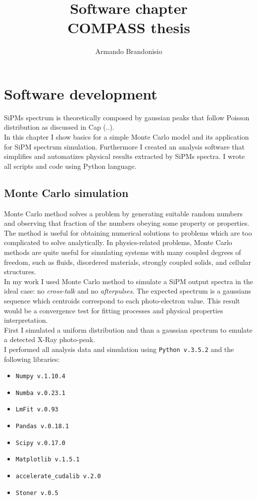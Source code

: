 \documentclass[10pt,a4paper, openany]{book}
\author{Armando Brandonisio}
\title{\textbf{Software chapter}\\COMPASS thesis}
\begin{document}
\maketitle
\tableofcontents \newpage

\chapter{Software development}
SiPMs spectrum is theoretically composed by gaussian peaks that follow Poisson distribution as discussed in Cap (..).\\
In this chapter I show basics for a simple Monte Carlo model and its application for SiPM spectrum simulation. Furthermore I created an analysis software that simplifies and automatizes physical results extracted by SiPMs spectra. I wrote all scripts and code using Python language. 

\section{Monte Carlo simulation}
Monte Carlo method solves a problem by generating suitable random numbers and observing that fraction of the numbers obeying some property or properties. The method is useful for obtaining numerical solutions to problems which are too complicated to solve analytically. In physics-related problems, Monte Carlo methods are quite useful for simulating systems with many coupled degrees of freedom, such as fluids, disordered materials, strongly coupled solids, and cellular structures.\\
In my work I used Monte Carlo method to simulate a SiPM output spectra in the ideal case: no \emph{cross-talk} and no \emph{afterpulses}. The expected spectrum is a gaussians sequence  which centroids correspond to each photo-electron value. This result would be a convergence test for fitting processes and physical properties interpretation.\\
First I simulated a uniform distribution and than a gaussian spectrum to emulate a detected X-Ray photo-peak.\\
I performed all analysis data and simulation using \verb|Python v.3.5.2| and the following libraries:
\begin{itemize}
\item \verb|Numpy v.1.10.4|
\item \verb|Numba v.0.23.1|
\item \verb|LmFit v.0.93|
\item \verb|Pandas v.0.18.1|
\item \verb|Scipy v.0.17.0|
\item \verb|Matplotlib v.1.5.1|
\item \verb|accelerate_cudalib v.2.0|
\item \verb|Stoner v.0.5|

\end{itemize}
\end{document}
